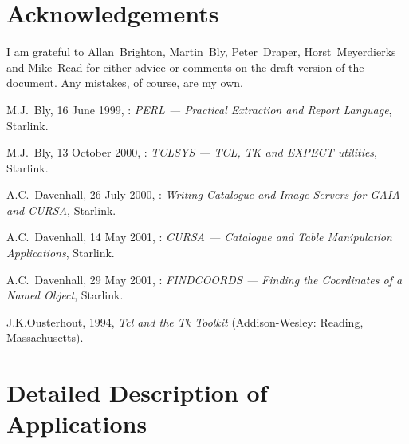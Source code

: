 \documentclass[twoside,11pt]{starlink}
\begin{document}
{}
\section*{Acknowledgements}

I am grateful to Allan~Brighton, Martin~Bly, Peter~Draper, Horst~Meyerdierks
and Mike~Read for either advice or comments on the draft version of the
document. Any mistakes, of course, are my own.




% 
{}
\begin{thebibliography}{99}

   M.J.~Bly, 16 June 1999,
   : \textit{PERL ---  Practical Extraction and
   Report Language}, Starlink.

   M.J.~Bly, 13 October 2000,
   : \textit{TCLSYS --- TCL, TK and EXPECT
   utilities}, Starlink.

   A.C.~Davenhall, 26 July 2000,
   : \textit{Writing Catalogue and Image Servers for
   GAIA and CURSA}, Starlink.

   A.C.~Davenhall, 14 May 2001,
   : \textit{CURSA --- Catalogue and Table
   Manipulation Applications}, Starlink.

   A.C.~Davenhall, 29 May 2001,
   : \textit{FINDCOORDS --- Finding the Coordinates
   of a Named Object}, Starlink.

   J.K.Ousterhout, 1994, \textit{Tcl and the Tk
   Toolkit}\/ (Addison-Wesley: Reading, Massachusetts).

\end{thebibliography}

\appendix
\section{Detailed Description of Applications}
\end{document}

